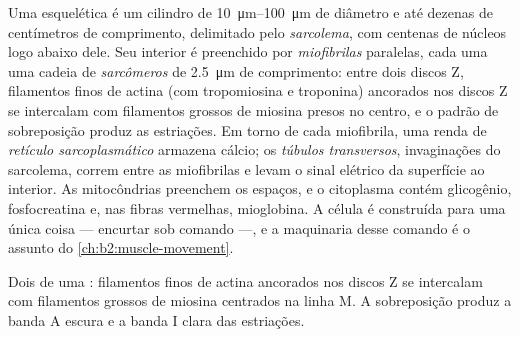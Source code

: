 \begin{definition}\label{def:b2:cell-differentiation:fibre}
Uma  esquelética é um cilindro de
\qtyrange{10}{100}{\micro m} de diâmetro e até dezenas de centímetros
de comprimento, delimitado pelo \emph{sarcolema}, com centenas de
núcleos logo abaixo dele. Seu interior é preenchido por
\emph{miofibrilas} paralelas, cada uma uma cadeia de \emph{sarcômeros}
de \qty{2.5}{\micro m} de comprimento: entre dois discos Z, filamentos
finos de actina (com tropomiosina e troponina) ancorados nos discos Z
se intercalam com filamentos grossos de miosina presos no centro, e o
padrão de sobreposição produz as estriações. Em torno de cada
miofibrila, uma renda de \emph{retículo sarcoplasmático} armazena
cálcio; os \emph{túbulos transversos}, invaginações do sarcolema,
correm entre as miofibrilas e levam o sinal elétrico da superfície ao
interior. As mitocôndrias preenchem os espaços, e o citoplasma contém
glicogênio, fosfocreatina e, nas fibras vermelhas, mioglobina. A célula
é construída para uma única coisa --- encurtar sob comando ---, e a
maquinaria desse comando é o assunto do \cref{ch:b2:muscle-movement}.
\end{definition}

\begin{omfigure}

{\small Dois  de uma : filamentos finos de actina
ancorados nos discos Z se intercalam com filamentos grossos de miosina
centrados na linha M. A sobreposição produz a banda A escura e a banda
I clara das estriações.}
\end{omfigure}

